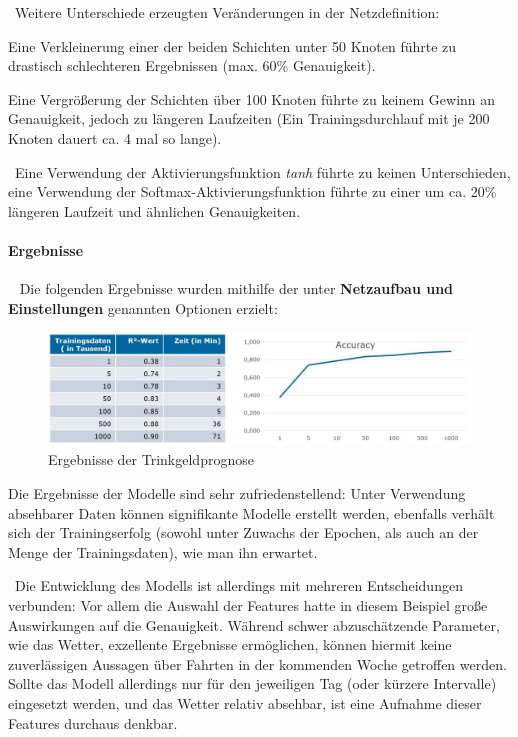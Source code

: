 ~\newline Weitere Unterschiede erzeugten Veränderungen in der Netzdefinition: 

Eine Verkleinerung einer der beiden Schichten unter 50 Knoten führte zu drastisch schlechteren Ergebnissen (max. 60\% Genauigkeit). 

Eine Vergrößerung der Schichten über 100 Knoten führte zu keinem Gewinn an Genauigkeit, jedoch zu längeren Laufzeiten (Ein Trainingsdurchlauf mit je 200 Knoten dauert ca. 4 mal so lange).

~\newline Eine Verwendung der Aktivierungsfunktion \textit{tanh} führte zu keinen Unterschieden, eine Verwendung der Softmax-Aktivierungsfunktion führte zu einer um ca. 20\% längeren Laufzeit und ähnlichen Genauigkeiten. 
\newpage
\paragraph{Ergebnisse} ~\newline
Die folgenden Ergebnisse wurden mithilfe der unter \textbf{Netzaufbau und Einstellungen} genannten Optionen erzielt:

\begin{figure}[h]
	\begin{center}
		\includegraphics[width=0.95\linewidth]{Bilder/TrinkgeldErgebnisse}
		\caption[Ergebnisse der Trinkgeldprognose]{Ergebnisse der Trinkgeldprognose}
		\label{fig:TipErg}
	\end{center}
\end{figure}

Die Ergebnisse der Modelle sind sehr zufriedenstellend: Unter Verwendung absehbarer Daten können signifikante Modelle erstellt werden, ebenfalls verhält sich der Trainingserfolg (sowohl unter Zuwachs der Epochen, als auch an der Menge der Trainingsdaten), wie man ihn erwartet. 

~\newline Die Entwicklung des Modells ist allerdings mit mehreren Entscheidungen verbunden: Vor allem die Auswahl der Features hatte in diesem Beispiel große Auswirkungen auf die Genauigkeit. Während schwer abzuschätzende Parameter, wie das Wetter, exzellente Ergebnisse ermöglichen, können hiermit keine zuverlässigen Aussagen über Fahrten in der kommenden Woche getroffen werden. Sollte das Modell allerdings nur für den jeweiligen Tag (oder kürzere Intervalle) eingesetzt werden, und das Wetter relativ absehbar, ist eine Aufnahme dieser Features durchaus denkbar. 

